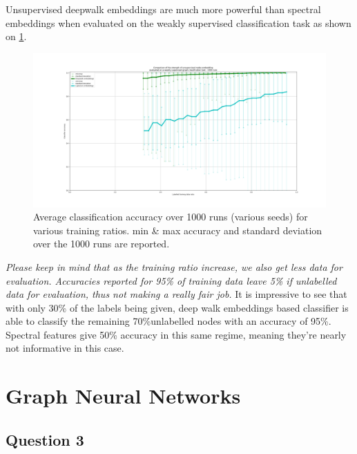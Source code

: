 \documentclass[a4paper]{article}
\begin{document}
Unsupervised deepwalk embeddings are much more powerful than spectral embeddings when evaluated on
the weakly supervised classification task as shown on \ref{fig:deepwalk_vs_laplacian_embdeddings}.
\begin{figure}[ht]
    \centering
    \includegraphics[width=1.\textwidth]{figures/deepwalk_vs_laplacian_embeddings_1000runs.png}
    \caption{Average classification accuracy over 1000 runs (various seeds) for various training ratios. 
    min \& max accuracy and standard deviation over the 1000 runs are reported.}
    \label{fig:deepwalk_vs_laplacian_embdeddings}
\end{figure}
\textit{Please keep in mind that as the training ratio increase, we also get less data for evaluation.
Accuracies reported for 95\% of training data leave 5\% if unlabelled data for evaluation,
thus not making a really fair job.} It is impressive to see that with only 30\% of the labels being given, deep walk
embeddings based classifier is able to classify the remaining 70\%unlabelled nodes with an accuracy of 95\%.
Spectral features give 50\% accuracy in this same regime, meaning they're nearly not informative in this case.



\break

\section{Graph Neural Networks}
\subsection*{Question 3}
\end{document}
